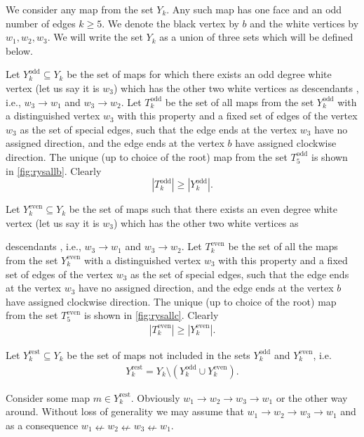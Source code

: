 \documentclass[submission]{FPSAC2021}
\DeclareMathOperator{\odd}{odd}
\DeclareMathOperator{\even}{even}
\DeclareMathOperator{\rest}{rest}
\newcommand{\successors}
{
	descendants
}
\begin{document}
We consider any map from the set $Y_k$. 
Any such map has one face and an odd 
number of edges $k \geq 5$. We denote 
the black vertex by $b$ and  the white
vertices by $w_1, w_2, w_3$. We will 
write the set $Y_k$ as a union of three 
sets which will be defined below.

Let $Y_{k}^{\odd}\subseteq Y_k$ be the 
set of maps for which there exists an
odd degree white vertex (let us say it 
is $w_3$) which has the other two white
vertices as \successors, i.e., 
$w_3\rightarrow w_1$ and 
$w_3\rightarrow w_2$. 
Let $T_k^{\odd}$ be the set of all 
maps from the set $Y_k^{\odd}$ with a 
distinguished vertex $w_3$ with this 
property and a fixed set of edges of 
the vertex $w_3$ as the set of special 
edges, such that the edge ends at the 
vertex $w_3$ have no assigned direction, 
and the edge ends at the vertex $b$ have 
assigned clockwise direction.
The unique (up to choice of the root) 
map from the set $T_{5}^{\odd}$ is 
shown in \cref{fig:rysallb}. Clearly
\begin{equation}
\label{ineqodd}
|T_{k}^{\odd}| \geq |Y_{k}^{\odd}|.
\end{equation}

Let $Y_{k}^{\even}\subseteq Y_k$ be 
the set of maps such that there
exists an even degree white vertex 
(let us say it is $w_3$) which has 
the other two white vertices as 
\successors, i.e., 
$w_3\rightarrow w_1$ and 
$w_3\rightarrow w_2$. 
Let $T_k^{\even}$ be the set of all  
the maps from the set $Y_k^{\even}$ 
with a distinguished vertex $w_3$ with 
this property and a fixed set of edges 
of the vertex $w_3$ as the set of special 
edges, such that the edge ends at the 
vertex $w_3$ have no assigned direction, 
and the edge ends at the vertex $b$ have 
assigned clockwise direction. 
The unique (up to choice of 
the root) map from the set $T_{5}^{\even}$ 
is shown in \cref{fig:rysallc}. Clearly
\begin{align}
\label{ineqeven}
|T_{k}^{\even}| \geq |Y_{k}^{\even}|.
\end{align}

Let $Y_{k}^{\rest}\subseteq Y_k$ be 
the set of maps not included in the
sets $Y_{k}^{\odd}$ and 
$Y_{k}^{\even}$, i.e. 
\begin{align}
\label{yrestdef}
Y_{k}^{\rest}=Y_k 
\setminus (Y_{k}^{\odd} 
\cup Y_{k}^{\even}).
\end{align}

Consider some map $m\in Y_{k}^{\rest}$. 
Obviously $w_1 \rightarrow w_2 
\rightarrow w_3 \rightarrow w_1$ or the 
other way around. Without  loss  of  
generality  we  may  assume  that 
$w_1 \rightarrow w_2 \rightarrow w_3 
\rightarrow w_1$ and as a consequence 
$w_1 \nleftarrow w_2 \nleftarrow w_3 
\nleftarrow w_1$.
\end{document}
